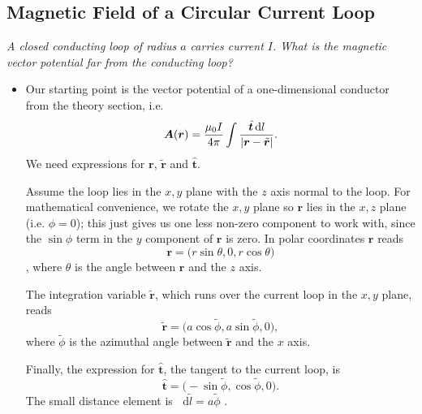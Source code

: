 \documentclass[11pt, a4paper]{article}
\newcommand{\diff}{\mathop{}\!\mathrm{d}} %
\renewcommand{\vec}[1]{\bm{#1}} %
\newcommand{\uvec}[1]{\hat{\vec{#1}}} %
\newcommand{\tvec}[1]{\tilde{\vec{#1}}} %
\renewcommand{\r}{\vec{r}}
\newcommand{\A}{\vec{A}}  %
\begin{document}
\subsection{Magnetic Field of a Circular Current Loop}
\textit{A closed conducting loop of radius $ a $ carries current $ I $. What is the magnetic vector potential far from the conducting loop?}
\begin{itemize}
	\item Our starting point is the vector potential of a one-dimensional conductor from the theory section, i.e.
	\begin{equation*}
		\A(\r) = \frac{\mu_{0}I}{4\pi} \int \frac{\uvec{t} \diff l}{\abs{\r - \tvec{r}}}.
	\end{equation*}
	We need expressions for $ \r $, $ \tvec{r} $ and $ \uvec{t} $.
	
	Assume the loop lies in the $ x, y $ plane with the $ z $ axis normal to the loop. For mathematical convenience, we rotate the $ x, y $ plane so $ \r $ lies in the $ x, z $ plane (i.e. $ \phi = 0 $); this just gives us one less non-zero component to work with, since the $ \sin \phi $ term in the $ y $ component of $ \r $ is zero. In polar coordinates $ \r $ reads
	\begin{equation*}
		\r = \big (r \sin \theta, 0, r \cos \theta \big )
	\end{equation*},
	where $ \theta $ is the angle between $ \r $ and the $ z $ axis. 
	
	The integration variable $ \tvec{r} $, which runs over the current loop in the $ x, y $ plane, reads
	\begin{equation*}
		\tvec{r} = \big(a \cos \tilde{\phi}, a \sin \tilde{\phi}, 0 \big),
	\end{equation*}
	where $ \tilde{\phi} $ is the azimuthal angle between $ \tvec{r} $ and the $ x $ axis. 
	
	Finally, the expression for $ \uvec{t} $, the tangent to the current loop, is
	\begin{equation*}
		\uvec{t} = \big( -\sin \tilde{\phi},  \cos \tilde{\phi}, 0\big).
	\end{equation*}
	The small distance element is $ \diff \tilde{l} = a \tilde{\phi}$ .
	

\end{itemize}
\end{document}
